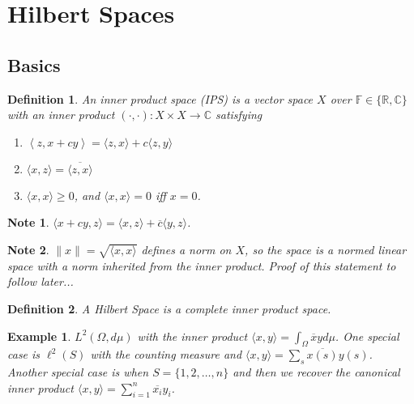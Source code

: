 \documentclass[letterpaper,twoside,11pt]{article}
\theoremstyle{mystyle}
\newtheorem{definition}{Definition}[section]
\newtheorem*{ex}{Example}
\newtheorem*{note}{Note}
\newcommand{\R}{{\mathbb R}}
\newcommand{\C}{{\mathbb C}}
\begin{document}
\newpage \section{Hilbert Spaces}
\subsection*{Basics}
\begin{definition}
  An inner product space (IPS) is a vector space $X$ over $\mathbb F \in \{\R,\C\}$ with an inner product $\left( \cdot , \cdot \right) : X\times X \to \C$ satisfying 
  \begin{enumerate}
    \item $\left\langle z, x + cy\right\rangle = \langle z, x\rangle + c \langle z, y\rangle$
    \item $\langle x, z\rangle = \overline{\langle z, x\rangle}$
    \item $\langle x, x \rangle \geq 0$, and $\langle x, x \rangle = 0$ iff $x=0$. 
  \end{enumerate}
\end{definition}

\begin{note}
  $\langle x+cy, z\rangle = \langle x, z\rangle + \overline c \langle y, z\rangle$. 
\end{note}
\begin{note}
  $\|x\| = \sqrt{\langle x , x\rangle }$ defines a norm on $X$, so the space is a normed linear space with a norm inherited from the inner product. Proof of this statement to follow later...
\end{note}
\begin{definition}
  A Hilbert Space is a complete inner product space. 
\end{definition}
\begin{ex}
  $L^2(\Omega, d\mu)$ with the inner product $\langle x, y\rangle = \displaystyle \int_\Omega \overline x y d\mu$. One special case is $\ell^2(S)$ with the counting measure and $\langle x, y \rangle = \sum_s \overline{x(s)}y(s)$. Another special case is when $S=\{1, 2, \dots, n\}$ and then we recover the canonical inner product $\langle x, y \rangle = \sum\limits_{i=1}^n \overline{x_i}y_i$. 
\end{ex}
\end{document}
